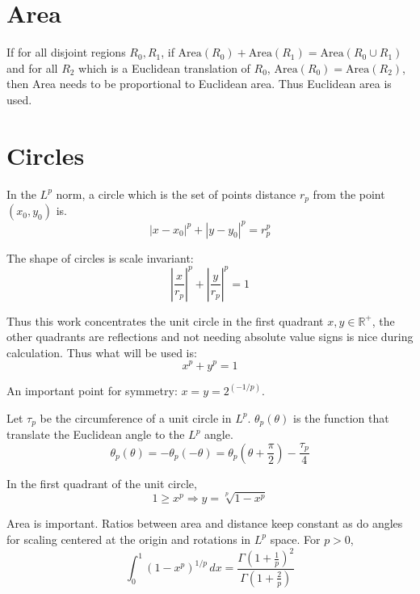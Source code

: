 \documentclass[]{article}
\newcommand{\paren}[1]{{\left(#1\right)}}
\newcommand{\abs}[1]{{\left\lvert#1\right\rvert}}
\begin{document}
\section{Area}
If for all disjoint regions $R_0,R_1$, if $\text{Area}\paren{R_0}+\text{Area}\paren{R_1}=\text{Area}\paren{R_0\cup R_1}$ and for all $R_2$ which is a Euclidean translation of $R_0$, $\text{Area}\paren{R_0}=\text{Area}\paren{R_2}$, then Area needs to be proportional to Euclidean area. Thus Euclidean area is used.

\section{Circles}
In the $L^p$ norm, a circle which is the set of points distance $r_p$ from the point $\paren{x_0,y_0}$ is.
\begin{equation}
\abs{x-x_0}^p+\abs{y-y_0}^p=r_p^p
\end{equation}

The shape of circles is scale invariant:
\begin{equation}
\abs{\frac{x}{r_p}}^p+\abs{\frac{y}{r_p}}^p=1
\end{equation}

Thus this work concentrates the unit circle in the first quadrant $x,y\in\mathbb{R}^+$, the other quadrants are reflections and not needing absolute value signs is nice during calculation. Thus what will be used is:
\begin{equation}
x^p+y^p=1
\end{equation}

An important point for symmetry: $x=y=2^\paren{-1/p}$.


Let $\tau_p$ be the circumference of a unit circle in $L^p$. $\theta_p\paren{\theta}$ is the function that translate the Euclidean angle to the $L^p$ angle. 
\begin{equation}
\theta_p\paren{\theta}=-\theta_p\paren{-\theta}=\theta_p\paren{\theta+\frac{\pi}{2}}-\frac{\tau_p}{4}
\end{equation}

In the first quadrant of the unit circle, 
\begin{equation}
1\geq x^p\Rightarrow y=\sqrt[p]{1-x^p}
\end{equation}

Area is important. Ratios between area and distance keep constant as do angles for scaling centered at the origin and rotations in $L^p$ space. For $p>0$,
\begin{equation}
\int_0^1 \paren{1-x^p}^{1/p} \, dx
=
\frac{\Gamma \left(1+\frac{1}{p}\right)^2}{\Gamma \left(1+\frac{2}{p}\right)}
\end{equation}
\end{document}
